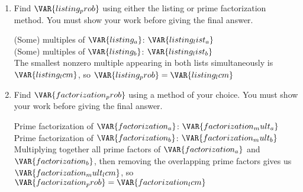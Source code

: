 
\begin{enumerate}

    \item Find $\VAR{listing_prob}$ using either the listing or prime factorization method. You must show your work before giving the final answer.

    \vfill

    \begin{ansenv}
        (Some) multiples of $\VAR{listing_a}$: $\VAR{listing_list_a}$\\

        (Some) multiples of $\VAR{listing_b}$: $\VAR{listing_list_b}$\\

        The smallest nonzero multiple appearing in both lists simultaneously is $\VAR{listing_lcm}$, so $\VAR{listing_prob} = \VAR{listing_lcm}$
    \end{ansenv}

    \vfill

    \item Find $\VAR{factorization_prob}$ using a method of your choice. You must show your work before giving the final answer.

    \vfill

    \begin{ansenv}
        Prime factorization of $\VAR{factorization_a}$: $\VAR{factorization_mult_a}$\\

        Prime factorization of $\VAR{factorization_b}$: $\VAR{factorization_mult_b}$\\

        Multiplying together all prime factors of $\VAR{factorization_a}$ and $\VAR{factorization_b}$, then removing the overlapping prime factors gives us $\VAR{factorization_mult_lcm}$, so $\VAR{factorization_prob} = \VAR{factorization_lcm}$
    \end{ansenv}

    \vfill

\end{enumerate}

\trueemptypage